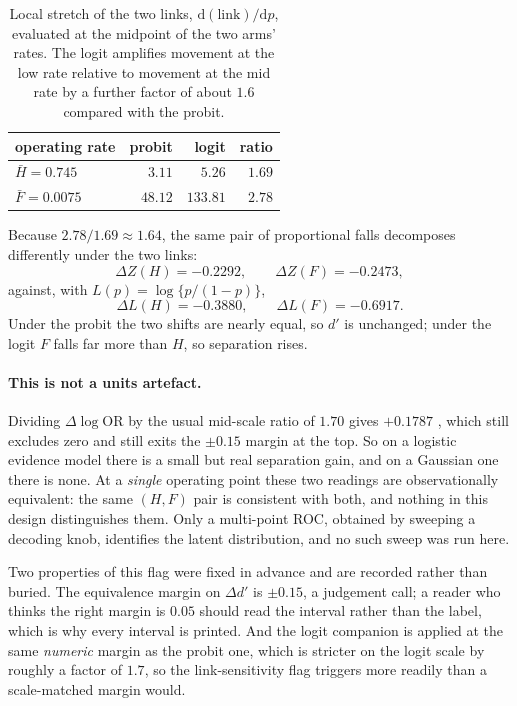 \begin{table}[htb]
\caption{Local stretch of the two links, $\mathrm{d}(\text{link})/\mathrm{d}p$, evaluated at the
midpoint of the two arms' rates. The logit amplifies movement at the low rate relative to movement
at the mid rate by a further factor of about $1.6$ compared with the probit.}
\label{tab:mdstretch}
\begin{center}
\small
\begin{tabular}{lrrr}
\toprule
operating rate & probit & logit & ratio \\
\midrule
$\bar{H} = 0.745$ & $3.11$ & $5.26$ & $1.69$ \\
$\bar{F} = 0.0075$ & $48.12$ & $133.81$ & $2.78$ \\
\bottomrule
\end{tabular}
\end{center}
\end{table}

Because $2.78 / 1.69 \approx 1.64$, the same pair of proportional falls decomposes differently under
the two links:
\[
\Delta Z(H) = -0.2292, \qquad \Delta Z(F) = -0.2473,
\]
against, with $L(p) = \log\{p/(1-p)\}$,
\[
\Delta L(H) = -0.3880, \qquad \Delta L(F) = -0.6917.
\]
Under the probit the two shifts are nearly equal, so $d'$ is unchanged; under the logit $F$ falls
far more than $H$, so separation rises.

\paragraph{This is not a units artefact.} Dividing $\Delta \log\mathrm{OR}$ by the usual mid-scale
ratio of $1.70$ gives $+0.1787$ , which still excludes zero and still exits the
$\pm 0.15$ margin at the top. So on a logistic evidence model there is a small but real separation
gain, and on a Gaussian one there is none. At a \emph{single} operating point these two readings are
observationally equivalent: the same $(H, F)$ pair is consistent with both, and nothing in this
design distinguishes them. Only a multi-point ROC, obtained by sweeping a decoding knob, identifies
the latent distribution, and no such sweep was run here.

Two properties of this flag were fixed in advance and are recorded rather than buried. The
equivalence margin on $\Delta d'$ is $\pm 0.15$, a judgement call; a reader who thinks the right
margin is $0.05$ should read the interval rather than the label, which is why every interval is
printed. And the logit companion is applied at the same \emph{numeric} margin as the probit one,
which is stricter on the logit scale by roughly a factor of $1.7$, so the link-sensitivity flag
triggers more readily than a scale-matched margin would.

